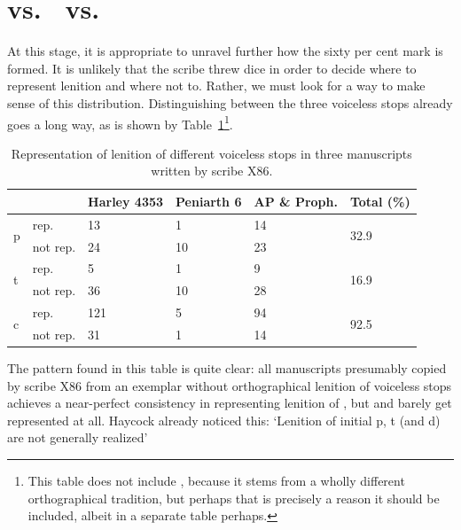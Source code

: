 \section{ vs.\  vs.\ }
At this stage, it is appropriate to unravel further how the sixty per cent mark is formed. It is unlikely that the scribe threw dice in order to decide where to represent lenition and where not to. Rather, we must look for a way to make sense of this distribution. Distinguishing between the three voiceless stops already goes a long way, as is shown by Table~\ref{perclenptcx86}\footnote{This table does not include , because it stems from a wholly different orthographical tradition, but perhaps that is precisely a reason it should be included, albeit in a separate table perhaps.}.


\begin{table}[h]
\centering
\begin{tabular}{@{}llllll@{}}
\toprule
\textbf{} & \textbf{\textbf{}} & \textbf{\textbf{Harley 4353}} & \textbf{\textbf{Peniarth 6}} & \textbf{AP \& Proph.} & \textbf{\textbf{Total (\%)}} \\ \midrule
\multirow{2}{*}{p} & rep. & 13 & 1 & 14 & \multirow{2}{*}{32.9} \\
 & not rep. & 24 & 10 & 23 &  \\
\multirow{2}{*}{t} & rep. & 5 & 1 & 9 & \multirow{2}{*}{16.9} \\
 & not rep. & 36 & 10 & 28 &  \\
\multirow{2}{*}{c} & rep. & 121 & 5 & 94 & \multirow{2}{*}{92.5} \\
 & not rep. & 31 & 1 & 14 &  \\ \bottomrule
\end{tabular}
\caption{Representation of lenition of different voiceless stops in three manuscripts written by scribe X86.}
\label{perclenptcx86}
\end{table}

The pattern found in this table is quite clear: all manuscripts presumably copied by scribe X86 from an exemplar without orthographical lenition of voiceless stops achieves a near-perfect consistency in representing lenition of , but  and  barely get represented at all. Haycock already noticed this:  `Lenition of initial p, t (and d) are not generally realized' \autocite[p.~7, n.~18]{haycock_legendary_2015}



